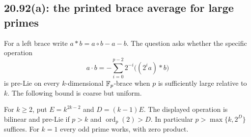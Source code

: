 \subsection{20.92(a): the printed brace average for large primes}
\label{cand:20.92}
For a left brace write \(a*b=a\circ b-a-b\). The question asks whether
the specific operation
\[
 a\cdot b=-\sum_{i=0}^{p-2}2^{-i}\bigl((2^ia)*b\bigr)
\]
is pre-Lie on every \(k\)-dimensional \(\mathbb F_p\)-brace when \(p\) is
sufficiently large relative to \(k\). The following bound is coarse but uniform.

\begin{proposition}
For \(k\ge2\), put \(E=k^{2k-2}\) and \(D=(k-1)E\).
The displayed operation is bilinear and pre-Lie if
\(p>k\) and \(\operatorname{ord}_p(2)>D\).
In particular \(p>\max\{k,2^D\}\) suffices.
For \(k=1\) every odd prime works, with zero product.
\end{proposition}
